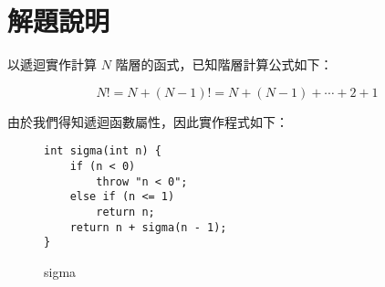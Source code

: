 \chapter{解題說明}

\hspace{2em}以遞迴實作計算 $N$ 階層的函式，已知階層計算公式如下：

$$
N! = N+(N-1)!=N+(N-1)+\cdots +2+1
$$

由於我們得知遞迴函數屬性，因此實作程式如下：

\begin{figure}[ht]
    \begin{verbatim}
int sigma(int n) {
    if (n < 0)
        throw "n < 0";
    else if (n <= 1)
        return n;
    return n + sigma(n - 1);
}
    \end{verbatim}

    \captionsetup{justification=centering}
    \caption{sigma}
    \label{fig:sigma}
\end{figure}